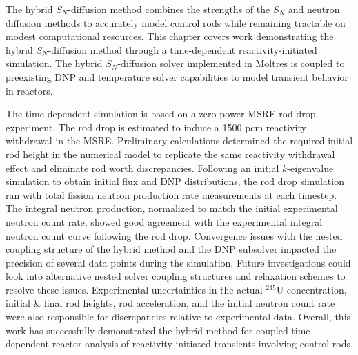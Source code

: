 The hybrid $S_N$-diffusion method combines the strengths of the $S_N$ and neutron
diffusion methods to accurately model control rods while remaining tractable on modest computational
resources. This chapter covers work demonstrating the hybrid $S_N$-diffusion method through a
time-dependent reactivity-initiated simulation. The hybrid $S_N$-diffusion solver implemented in
Moltres is coupled to preexisting \gls{DNP} and temperature solver capabilities to model
transient behavior in reactors.

The time-dependent simulation is based on a zero-power \gls{MSRE} rod drop experiment. The
rod drop is estimated to induce a 1500 pcm reactivity withdrawal in the \gls{MSRE}. Preliminary
calculations determined the required initial rod height in the numerical model to replicate the
same reactivity withdrawal effect and eliminate rod worth discrepancies. Following an initial
$k$-eigenvalue simulation to obtain initial flux and \gls{DNP} distributions, the rod drop
simulation ran with total fission neutron production rate measurements at each timestep. The
integral neutron production, normalized to match the initial experimental neutron count rate,
showed good agreement with the experimental integral neutron count curve following the rod drop.
Convergence issues with the nested coupling structure of the hybrid method and the \gls{DNP}
subsolver impacted the precision of several data points during the simulation.
Future investigations could look into alternative nested solver coupling structures and relaxation
schemes to resolve these issues.
Experimental uncertainties in the actual $^{235}$U concentration, initial \& final rod heights, rod
acceleration, and the initial neutron count rate were also responsible for discrepancies relative
to experimental data.
Overall, this work has successfully demonstrated the hybrid method for coupled time-dependent
reactor analysis of reactivity-initiated transients involving control rods.
